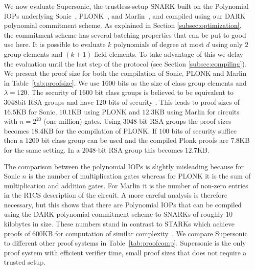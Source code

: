 We now evaluate \textsf{Supersonic}, the trustless-setup SNARK built on the Polynomial IOPs underlying \textsf{Sonic}~\cite{Sonic}, \textsf{PLONK}~\cite{Plonk}, and \textsf{Marlin}~\cite{Marlin}, and compiled using our DARK polynomial commitment scheme. As explained in Section \ref{subsec:optimization}, the commitment scheme has several batching properties that can be put to good use here. It is possible to evaluate $k$ polynomials of degree at most $d$ using only $2$ group elements and $(k+1)$ field elements. To take advantage of this we delay the evaluation until the last step of the protocol (see Section \ref{subsec:compiling}). We present the proof size for both the compilation of \textsf{Sonic}, \textsf{PLONK} and \textsf{Marlin} in Table~\ref{tab:proofsize}. We use 1600 bits as the size of class group elements and $\lambda=120$. The security of 1600 bit class groups is believed to be equivalent to 3048bit RSA groups and have 120 bits of security \cite{PKC/BucHam01,DBLP:journals/corr/BiasseJS10}. This leads to proof sizes of $16.5$KB for \textsf{Sonic}, $10.1$KB using \textsf{PLONK} and $12.3$KB using \textsf{Marlin} for circuits with $n = 2^{20}$ (one million) gates. Using 3048-bit RSA groups the proof sizes becomes $18.4$KB for the compilation of  \textsf{PLONK}. If $100$ bits of security suffice then a $1200$ bit class group can be used and the compiled Plonk proofs are $7.8$KB for the same setting. In a $2048$-bit RSA group this becomes $12.7$KB.

The comparison between the polynomial IOPs is slightly misleading because for \textsf{Sonic} $n$ is the number of multiplication gates whereas for \textsf{PLONK} it is the sum of multiplication and addition gates. For \textsf{Marlin} it is the number of non-zero entries in the R1CS description of the circuit. A more careful analysis is therefore necessary, but this shows that there are Polynomial IOPs that can be compiled using the DARK polynomial commitment scheme to SNARKs of roughly $10$ kilobytes in size. These numbers stand in contrast to \textsf{STARK}s which achieve proofs of $600$KB for computation of similar complexity~\cite{C:BBHR19}. We compare \textsf{Supersonic} to different other proof systems in Table~\ref{tab:proofcomp}. \textsf{Supersonic} is the only proof system with efficient verifier time, small proof sizes that does not require a trusted setup.

